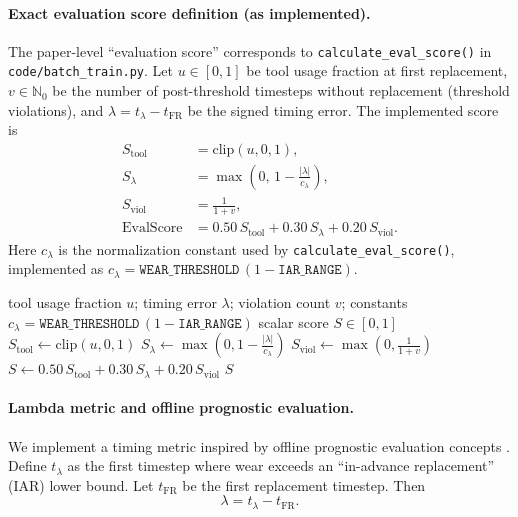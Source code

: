 \documentclass[sn-basic]{sn-jnl} %
\begin{document}
\paragraph{Exact evaluation score definition (as implemented).}
The paper-level ``evaluation score'' corresponds to \texttt{calculate\_eval\_score()} in \texttt{code/batch\_train.py}. Let $u\in[0,1]$ be tool usage fraction at first replacement, $v\in\mathbb{N}_0$ be the number of post-threshold timesteps without replacement (threshold violations), and $\lambda=t_{\lambda}-t_{\mathrm{FR}}$ be the signed timing error. The implemented score is
\begin{align}
S_{\text{tool}} &= \mathrm{clip}(u,0,1),\\
S_{\lambda} &= \max\left(0,\,1-\frac{|\lambda|}{c_{\lambda}}\right),\\
S_{\text{viol}} &= \frac{1}{1+v},\\
\mathrm{EvalScore} &= 0.50\,S_{\text{tool}} + 0.30\,S_{\lambda} + 0.20\,S_{\text{viol}}.
\end{align}
Here $c_{\lambda}$ is the normalization constant used by \texttt{calculate\_eval\_score()}, implemented as $c_{\lambda}=\texttt{WEAR\_THRESHOLD}\,(1-\texttt{IAR\_RANGE})$.

\begin{algorithm}[t]
\caption{Evaluation score computation (per evaluation run)}
\label{alg:eval_score}
\begin{algorithmic}[1]
\Require tool usage fraction $u$; timing error $\lambda$; violation count $v$; constants $c_{\lambda}=\texttt{WEAR\_THRESHOLD}\,(1-\texttt{IAR\_RANGE})$
\Ensure scalar score $S\in[0,1]$
\State $S_{\mathrm{tool}} \gets \mathrm{clip}(u, 0, 1)$
\State $S_{\lambda} \gets \max\left(0, 1 - \frac{|\lambda|}{c_{\lambda}}\right)$
\State $S_{\mathrm{viol}} \gets \max\left(0, \frac{1}{1+v}\right)$
\State $S \gets 0.50\,S_{\mathrm{tool}} + 0.30\,S_{\lambda} + 0.20\,S_{\mathrm{viol}}$
\State \Return $S$
\end{algorithmic}
\end{algorithm}

\paragraph{Lambda metric and offline prognostic evaluation.}
We implement a timing metric inspired by offline prognostic evaluation concepts \cite{Saxena2010Metrics}. Define $t_{\lambda}$ as the first timestep where wear exceeds an ``in-advance replacement'' (IAR) lower bound. Let $t_{\mathrm{FR}}$ be the first replacement timestep. Then
\begin{equation}
		\lambda = t_{\lambda} - t_{\mathrm{FR}}.
\end{equation}
\end{document}
